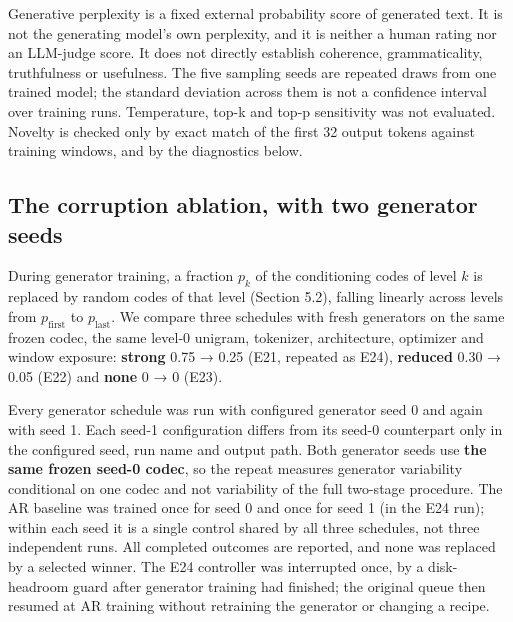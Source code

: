 \documentclass[
  british,
]{article}
\newcounter{none} %
\begin{document}
Generative perplexity is a fixed external probability score of generated
text. It is not the generating model's own perplexity, and it is neither
a human rating nor an LLM-judge score. It does not directly establish
coherence, grammaticality, truthfulness or usefulness. The five sampling
seeds are repeated draws from one trained model; the standard deviation
across them is not a confidence interval over training runs.
Temperature, top-k and top-p sensitivity was not evaluated. Novelty is
checked only by exact match of the first 32 output tokens against
training windows, and by the diagnostics below.

\subsection{The corruption ablation, with two generator
seeds}\label{the-corruption-ablation-with-two-generator-seeds}

During generator training, a fraction \(p_k\) of the conditioning codes
of level \(k\) is replaced by random codes of that level (Section 5.2),
falling linearly across levels from \(p_{\mathrm{first}}\) to
\(p_{\mathrm{last}}\). We compare three schedules with fresh generators
on the same frozen codec, the same level-0 unigram, tokenizer,
architecture, optimizer and window exposure: \textbf{strong} 0.75 → 0.25
(E21, repeated as E24), \textbf{reduced} 0.30 → 0.05 (E22) and
\textbf{none} 0 → 0 (E23).

Every generator schedule was run with configured generator seed 0 and
again with seed 1. Each seed-1 configuration differs from its seed-0
counterpart only in the configured seed, run name and output path. Both
generator seeds use \textbf{the same frozen seed-0 codec}, so the repeat
measures generator variability conditional on one codec and not
variability of the full two-stage procedure. The AR baseline was trained
once for seed 0 and once for seed 1 (in the E24 run); within each seed
it is a single control shared by all three schedules, not three
independent runs. All completed outcomes are reported, and none was
replaced by a selected winner. The E24 controller was interrupted once,
by a disk-headroom guard after generator training had finished; the
original queue then resumed at AR training without retraining the
generator or changing a recipe.
\end{document}
